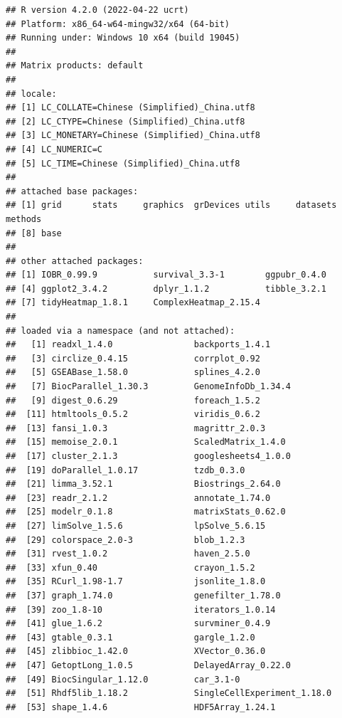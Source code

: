 \documentclass[
  12pt,
]{book}
\begin{document}
\begin{verbatim}
## R version 4.2.0 (2022-04-22 ucrt)
## Platform: x86_64-w64-mingw32/x64 (64-bit)
## Running under: Windows 10 x64 (build 19045)
## 
## Matrix products: default
## 
## locale:
## [1] LC_COLLATE=Chinese (Simplified)_China.utf8 
## [2] LC_CTYPE=Chinese (Simplified)_China.utf8   
## [3] LC_MONETARY=Chinese (Simplified)_China.utf8
## [4] LC_NUMERIC=C                               
## [5] LC_TIME=Chinese (Simplified)_China.utf8    
## 
## attached base packages:
## [1] grid      stats     graphics  grDevices utils     datasets  methods  
## [8] base     
## 
## other attached packages:
## [1] IOBR_0.99.9           survival_3.3-1        ggpubr_0.4.0         
## [4] ggplot2_3.4.2         dplyr_1.1.2           tibble_3.2.1         
## [7] tidyHeatmap_1.8.1     ComplexHeatmap_2.15.4
## 
## loaded via a namespace (and not attached):
##   [1] readxl_1.4.0                backports_1.4.1            
##   [3] circlize_0.4.15             corrplot_0.92              
##   [5] GSEABase_1.58.0             splines_4.2.0              
##   [7] BiocParallel_1.30.3         GenomeInfoDb_1.34.4        
##   [9] digest_0.6.29               foreach_1.5.2              
##  [11] htmltools_0.5.2             viridis_0.6.2              
##  [13] fansi_1.0.3                 magrittr_2.0.3             
##  [15] memoise_2.0.1               ScaledMatrix_1.4.0         
##  [17] cluster_2.1.3               googlesheets4_1.0.0        
##  [19] doParallel_1.0.17           tzdb_0.3.0                 
##  [21] limma_3.52.1                Biostrings_2.64.0          
##  [23] readr_2.1.2                 annotate_1.74.0            
##  [25] modelr_0.1.8                matrixStats_0.62.0         
##  [27] limSolve_1.5.6              lpSolve_5.6.15             
##  [29] colorspace_2.0-3            blob_1.2.3                 
##  [31] rvest_1.0.2                 haven_2.5.0                
##  [33] xfun_0.40                   crayon_1.5.2               
##  [35] RCurl_1.98-1.7              jsonlite_1.8.0             
##  [37] graph_1.74.0                genefilter_1.78.0          
##  [39] zoo_1.8-10                  iterators_1.0.14           
##  [41] glue_1.6.2                  survminer_0.4.9            
##  [43] gtable_0.3.1                gargle_1.2.0               
##  [45] zlibbioc_1.42.0             XVector_0.36.0             
##  [47] GetoptLong_1.0.5            DelayedArray_0.22.0        
##  [49] BiocSingular_1.12.0         car_3.1-0                  
##  [51] Rhdf5lib_1.18.2             SingleCellExperiment_1.18.0
##  [53] shape_1.4.6                 HDF5Array_1.24.1           

\end{verbatim}
\end{document}
